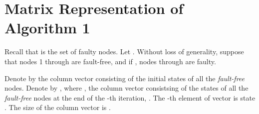 \documentclass[letterpaper, 12pt]{article}
\newenvironment{proof}{\paragraph{\bf Proof:}}{\hspace*{\fill}}
\newcommand{\comment}[1]{}
\newtheorem{definition}{Definition}
\newtheorem{lemma}{Lemma}
\begin{document}
\comment{======================
\begin{definition}
\label{d_type}
Two matrices of identical size are said to be of the same ``type'' if
they contain non-zero elements in identical positions.
\end{definition}
Let us denote by  the {\em type} of matrix .
A partial order can be
defined on the matrix types. Specifically, for matrices  and ,
 provided that matrix  is non-zero in each position
where  is non-zero.

\begin{lemma}
\label{l_scambling_1}
For any two row stochastic matrices  of the same size,
if  and  is a scrambling matrix,
then  is a scrambling matrix.
\end{lemma}
\begin{proof}
Follows immediately from the definition of matrix {\em type}
and {\em scrambling} matrices.
\end{proof}

~

\begin{lemma}
\label{l_scrambling_2}
Consider a sequence  of square row stochastic matrices
with non-zero diagonals. For any subset  of ,

\end{lemma}
\begin{proof}
The proof follows from the definition of matrix {\em type}, and the fact
the row stochastic matrices above have non-zero diagonals. 
\end{proof}

~
=================================================}

\section{Matrix Representation of Algorithm 1}
\label{s_claim}

Recall that  is the set of faulty nodes.
Let .
Without loss of generality, suppose that nodes 1 through  are
fault-free, and if , nodes  through  are faulty.

Denote by  the column vector consisting of the initial states of
all the {\em fault-free} nodes.
Denote by , where , the column vector consistsing of
the states of all the {\em fault-free} nodes
at the end of the -th iteration, .
The -th element
of vector  is state . The size of the column
vector  is
.



~
\end{document}
